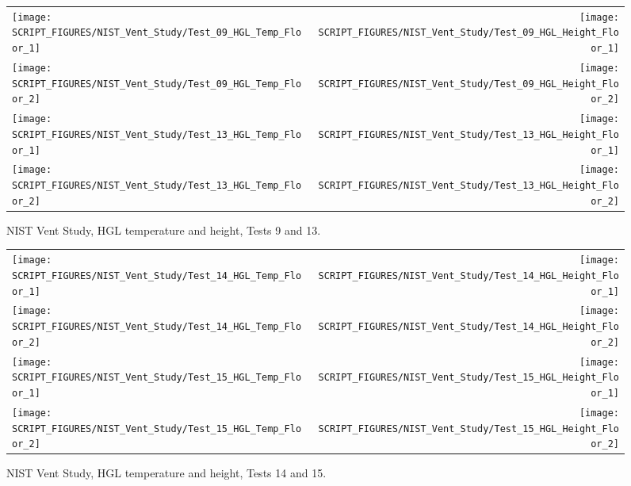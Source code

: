 \begin{figure}[p]
\begin{tabular*}{\textwidth}{l@{\extracolsep{\fill}}r}
\texttt{[image: SCRIPT\_FIGURES/NIST\_Vent\_Study/Test\_09\_HGL\_Temp\_Floor\_1]} &
\texttt{[image: SCRIPT\_FIGURES/NIST\_Vent\_Study/Test\_09\_HGL\_Height\_Floor\_1]} \\
\texttt{[image: SCRIPT\_FIGURES/NIST\_Vent\_Study/Test\_09\_HGL\_Temp\_Floor\_2]} &
\texttt{[image: SCRIPT\_FIGURES/NIST\_Vent\_Study/Test\_09\_HGL\_Height\_Floor\_2]} \\
\texttt{[image: SCRIPT\_FIGURES/NIST\_Vent\_Study/Test\_13\_HGL\_Temp\_Floor\_1]} &
\texttt{[image: SCRIPT\_FIGURES/NIST\_Vent\_Study/Test\_13\_HGL\_Height\_Floor\_1]} \\
\texttt{[image: SCRIPT\_FIGURES/NIST\_Vent\_Study/Test\_13\_HGL\_Temp\_Floor\_2]} &
\texttt{[image: SCRIPT\_FIGURES/NIST\_Vent\_Study/Test\_13\_HGL\_Height\_Floor\_2]}
\end{tabular*}
\caption[NIST Vent Study, HGL temperature and height, Tests 9 and 13]
{NIST Vent Study, HGL temperature and height, Tests 9 and 13.}
\label{NIST_Vent_Study_9_13}
\end{figure}

\begin{figure}[p]
\begin{tabular*}{\textwidth}{l@{\extracolsep{\fill}}r}
\texttt{[image: SCRIPT\_FIGURES/NIST\_Vent\_Study/Test\_14\_HGL\_Temp\_Floor\_1]} &
\texttt{[image: SCRIPT\_FIGURES/NIST\_Vent\_Study/Test\_14\_HGL\_Height\_Floor\_1]} \\
\texttt{[image: SCRIPT\_FIGURES/NIST\_Vent\_Study/Test\_14\_HGL\_Temp\_Floor\_2]} &
\texttt{[image: SCRIPT\_FIGURES/NIST\_Vent\_Study/Test\_14\_HGL\_Height\_Floor\_2]} \\
\texttt{[image: SCRIPT\_FIGURES/NIST\_Vent\_Study/Test\_15\_HGL\_Temp\_Floor\_1]} &
\texttt{[image: SCRIPT\_FIGURES/NIST\_Vent\_Study/Test\_15\_HGL\_Height\_Floor\_1]} \\
\texttt{[image: SCRIPT\_FIGURES/NIST\_Vent\_Study/Test\_15\_HGL\_Temp\_Floor\_2]} &
\texttt{[image: SCRIPT\_FIGURES/NIST\_Vent\_Study/Test\_15\_HGL\_Height\_Floor\_2]}
\end{tabular*}
\caption[NIST Vent Study, HGL temperature and height, Tests 14 and 15]
{NIST Vent Study, HGL temperature and height, Tests 14 and 15.}
\label{NIST_Vent_Study_14_15}
\end{figure}



